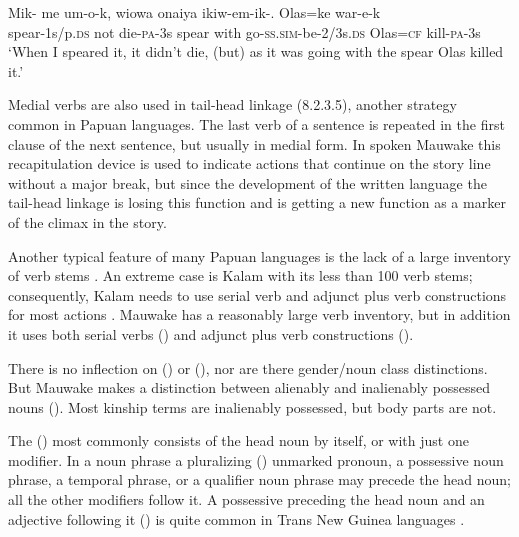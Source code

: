  
\ea%
\label{ex:x663}
\gll Mik-   me  um-o-k,  wiowa  onaiya  ikiw-em-ik-. Olas=ke  war-e-k\\
spear-1s/p.\textsc{ds}  not  die-\textsc{pa}-3s  spear  with  go-\textsc{ss.sim}-be-2/3s.\textsc{ds} Olas=\textsc{cf}  kill-\textsc{pa}-3s\\
\glt`When I speared it, it didn't die, (but) as it was going with the spear Olas killed it.'
\z


Medial verbs are also used in tail-head linkage (8.2.3.5), another strategy common in Papuan languages. The last verb of a sentence is repeated in the first clause of the next sentence, but usually in medial form.  In spoken Mauwake this recapitulation device is used to indicate actions that continue on the story line without a major break, but since the development of the written language the tail-head linkage is losing this function and is getting a new function as a  marker of the climax in the story.

Another typical feature of many Papuan languages is the lack of a large inventory of verb stems \citep[127]{Foley1986}. An extreme case is Kalam with its less than 100 verb stems; consequently, Kalam needs to use serial verb and adjunct plus verb constructions for most actions \citep[336--337]{Pawley1987}. Mauwake has a reasonably large verb inventory, but in addition it uses both serial verbs () and adjunct plus verb constructions ().

There is no inflection on  () or (), nor are there gender/noun class distinctions. But Mauwake makes a distinction between alienably and inalienably possessed nouns ().  Most kinship terms are inalienably possessed, but body parts are not.

The  () most commonly consists of the head noun by itself, or with just one modifier.  In a noun phrase a pluralizing () unmarked pronoun, a possessive noun phrase, a temporal phrase, or a qualifier noun phrase may precede the head noun; all the other modifiers follow it. A possessive preceding the head noun and an adjective following it () is quite common in Trans New Guinea languages \citep[19]{Reesink1987}. 

